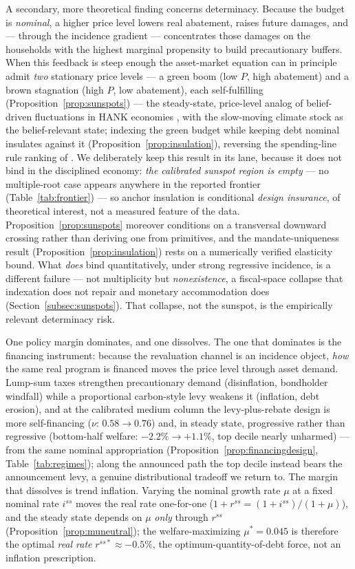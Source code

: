 \documentclass[12pt]{article}
\begin{document}
A secondary, more theoretical finding concerns determinacy. Because the budget
is \emph{nominal}, a higher price level lowers real abatement, raises future
damages, and --- through the incidence gradient --- concentrates those damages
on the households with the highest marginal propensity to build precautionary
buffers. When this feedback is steep enough the asset-market equation can in
principle admit \emph{two} stationary price levels --- a green boom (low $P$,
high abatement) and a brown stagnation (high $P$, low abatement), each
self-fulfilling (Proposition~\ref{prop:sunspots}) --- the steady-state,
price-level analog of belief-driven fluctuations in HANK economies
\citep{acharyabenhabib2024}, with the slow-moving climate stock as the
belief-relevant state; indexing the green budget while keeping debt nominal
insulates against it (Proposition~\ref{prop:insulation}), reversing the
spending-line rule ranking of \citet{hagedorn2026dtpl}. We deliberately keep
this result in its lane, because it does not bind in the disciplined economy:
\emph{the calibrated sunspot region is empty} --- no multiple-root case
appears anywhere in the reported frontier (Table~\ref{tab:frontier}) --- so
anchor insulation is conditional \emph{design insurance}, of theoretical
interest, not a measured feature of the data. Proposition~\ref{prop:sunspots}
moreover conditions on a transversal downward crossing rather than deriving one
from primitives, and the mandate-uniqueness result
(Proposition~\ref{prop:insulation}) rests on a numerically verified elasticity
bound. What \emph{does} bind quantitatively, under strong regressive incidence,
is a different failure --- not multiplicity but \emph{nonexistence}, a
fiscal-space collapse that indexation does not repair and monetary
accommodation does (Section~\ref{subsec:sunspots}). That collapse, not the
sunspot, is the empirically relevant determinacy risk.

One policy margin dominates, and one dissolves. The one that dominates is
the financing instrument: because the revaluation channel is an incidence
object, \emph{how} the same real program is financed moves the price level
through asset demand. Lump-sum taxes strengthen precautionary demand
(disinflation, bondholder windfall) while a proportional carbon-style levy
weakens it (inflation, debt erosion), and at the calibrated medium column the
levy-plus-rebate design is more self-financing ($\nu$: $0.58 \to 0.76$) and,
in steady state, progressive rather than regressive (bottom-half welfare:
$-2.2\% \to +1.1\%$, top decile nearly unharmed) --- from the same nominal
appropriation (Proposition~\ref{prop:financingdesign},
Table~\ref{tab:regimes}); along the announced path the top decile instead
bears the announcement levy, a genuine distributional tradeoff we return to.
The margin that dissolves is trend inflation. Varying the nominal growth
rate $\mu$ at a fixed nominal rate $i^{ss}$ moves the real rate one-for-one
($1+r^{ss}=(1+i^{ss})/(1+\mu)$), and the steady state depends on $\mu$
\emph{only} through $r^{ss}$ (Proposition~\ref{prop:muneutral}); the
welfare-maximizing $\mu^{*}=0.045$ is therefore the optimal \emph{real rate}
$r^{ss*}\approx-0.5\%$, the \citet{aiyagarimcgrattan1998}
optimum-quantity-of-debt force, not an inflation prescription.
\end{document}
